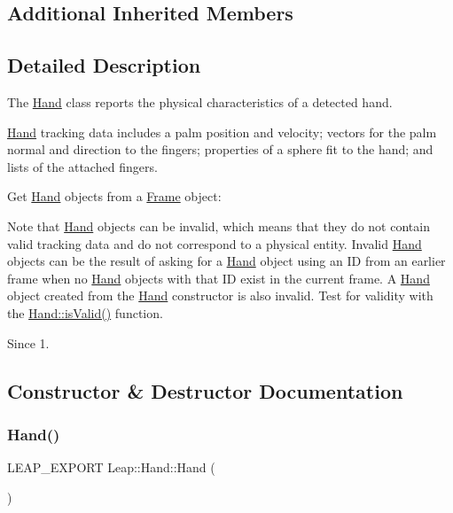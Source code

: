 \subsection*{Additional Inherited Members}


\subsection{Detailed Description}
The \hyperlink{class_leap_1_1_hand}{Hand} class reports the physical characteristics of a detected hand.

\hyperlink{class_leap_1_1_hand}{Hand} tracking data includes a palm position and velocity; vectors for the palm normal and direction to the fingers; properties of a sphere fit to the hand; and lists of the attached fingers.

Get \hyperlink{class_leap_1_1_hand}{Hand} objects from a \hyperlink{class_leap_1_1_frame}{Frame} object\+:


\begin{DoxyCodeInclude}
\end{DoxyCodeInclude}


Note that \hyperlink{class_leap_1_1_hand}{Hand} objects can be invalid, which means that they do not contain valid tracking data and do not correspond to a physical entity. Invalid \hyperlink{class_leap_1_1_hand}{Hand} objects can be the result of asking for a \hyperlink{class_leap_1_1_hand}{Hand} object using an ID from an earlier frame when no \hyperlink{class_leap_1_1_hand}{Hand} objects with that ID exist in the current frame. A \hyperlink{class_leap_1_1_hand}{Hand} object created from the \hyperlink{class_leap_1_1_hand}{Hand} constructor is also invalid. Test for validity with the \hyperlink{class_leap_1_1_hand_a596f55bc25a088c0a1760bbbca5ec2a8}{Hand\+::is\+Valid()} function. \begin{DoxySince}{Since}
1. 
\end{DoxySince}


\subsection{Constructor \& Destructor Documentation}
\mbox{\label{class_leap_1_1_hand_a56f41d7f4cded32073c7bec2cebe926d}} 
\subsubsection{\texorpdfstring{Hand()}{Hand()}}
{\footnotesize\ttfamily L\+E\+A\+P\+\_\+\+E\+X\+P\+O\+RT Leap\+::\+Hand\+::\+Hand (\begin{DoxyParamCaption}{ }\end{DoxyParamCaption})}

